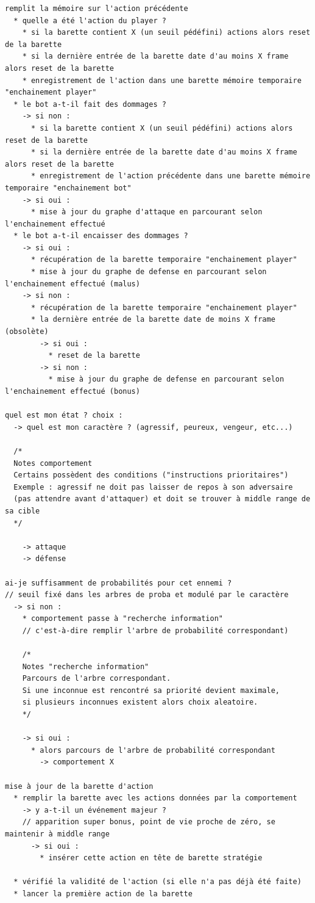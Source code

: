 \begin{scriptsize}
\begin{verbatim}
remplit la mémoire sur l'action précédente
  * quelle a été l'action du player ?
    * si la barette contient X (un seuil pédéfini) actions alors reset de la barette
    * si la dernière entrée de la barette date d'au moins X frame alors reset de la barette
    * enregistrement de l'action dans une barette mémoire temporaire "enchainement player"
  * le bot a-t-il fait des dommages ?
    -> si non : 
      * si la barette contient X (un seuil pédéfini) actions alors reset de la barette
      * si la dernière entrée de la barette date d'au moins X frame alors reset de la barette 
      * enregistrement de l'action précédente dans une barette mémoire temporaire "enchainement bot"
    -> si oui :
      * mise à jour du graphe d'attaque en parcourant selon l'enchainement effectué
  * le bot a-t-il encaisser des dommages ?
    -> si oui :
      * récupération de la barette temporaire "enchainement player"
      * mise à jour du graphe de defense en parcourant selon l'enchainement effectué (malus)
    -> si non :
      * récupération de la barette temporaire "enchainement player"
      * la dernière entrée de la barette date de moins X frame (obsolète)
        -> si oui : 
          * reset de la barette
        -> si non :
          * mise à jour du graphe de defense en parcourant selon l'enchainement effectué (bonus)   
			
quel est mon état ? choix :
  -> quel est mon caractère ? (agressif, peureux, vengeur, etc...)
	
  /*
  Notes comportement
  Certains possèdent des conditions ("instructions prioritaires")
  Exemple : agressif ne doit pas laisser de repos à son adversaire 
  (pas attendre avant d'attaquer) et doit se trouver à middle range de sa cible
  */
	
    -> attaque
    -> défense
		
ai-je suffisamment de probabilités pour cet ennemi ? 
// seuil fixé dans les arbres de proba et modulé par le caractère
  -> si non : 
    * comportement passe à "recherche information"
    // c'est-à-dire remplir l'arbre de probabilité correspondant)
		
    /*
    Notes "recherche information"
    Parcours de l'arbre correspondant.
    Si une inconnue est rencontré sa priorité devient maximale,
    si plusieurs inconnues existent alors choix aleatoire. 
    */
		
    -> si oui : 
      * alors parcours de l'arbre de probabilité correspondant
        -> comportement X

mise à jour de la barette d'action
  * remplir la barette avec les actions données par la comportement
    -> y a-t-il un événement majeur ?
    // apparition super bonus, point de vie proche de zéro, se maintenir à middle range
      -> si oui :
        * insérer cette action en tête de barette stratégie
			
  * vérifié la validité de l'action (si elle n'a pas déjà été faite)		
  * lancer la première action de la barette
\end{verbatim}
\end{scriptsize}
